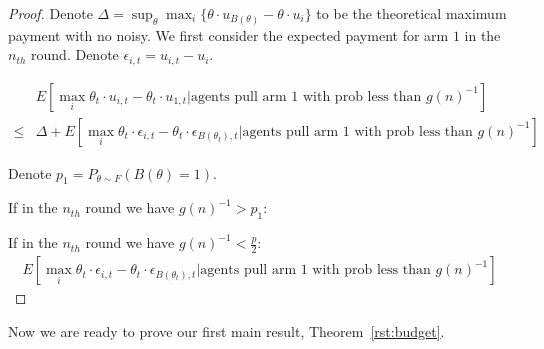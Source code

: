 \documentclass{article}
\begin{document}
\begin{proof}
Denote $\Delta=\sup_{\theta}\max_{i}\{\theta\cdot u_{B(\theta)}-\theta\cdot u_{i}\}$ to be the theoretical maximum payment with no noisy. We first consider the expected payment for arm $1$ in the $n_{th}$ round. Denote $\epsilon_{i,t}=u_{i,t}-u_{i}$.

\begin{align}
&E[\max_{i}\theta_t\cdot u_{i,t}-\theta_t\cdot u_{1,t}|\text{agents pull arm $1$ with prob less than $g(n)^{-1}$}] \nonumber \\
\leq & \Delta + E[\max_{i}\theta_t\cdot \epsilon_{i,t}-\theta_t\cdot \epsilon_{B(\theta_t),t}|\text{agents pull arm $1$ with prob less than $g(n)^{-1}$}] \nonumber 
\end{align}

Denote $p_1=P_{\theta\sim F}(B(\theta)=1)$. 


If in the $n_{th}$ round we have $g(n)^{-1}>p_1$:


If in the $n_{th}$ round we have $g(n)^{-1}<\frac{p}{2}$:
\begin{align}
E[\max_{i}\theta_t\cdot \epsilon_{i,t}-\theta_t\cdot \epsilon_{B(\theta_t),t}|\text{agents pull arm $1$ with prob less than $g(n)^{-1}$}]  \nonumber 
\end{align}

\end{proof}



Now we are ready to prove our first main result, Theorem~\ref{rst:budget}.
\end{document}
